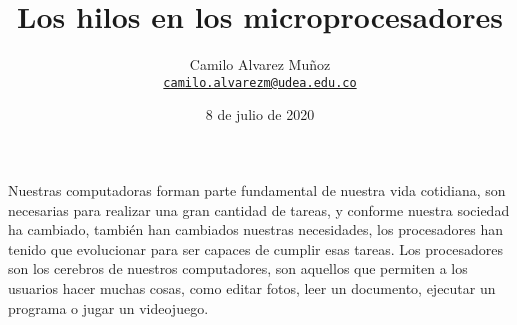 \documentclass[12pt]{article}
\title{Los hilos en los microprocesadores}
\date{8 de julio de 2020}
\author{Camilo Alvarez Muñoz\\
\href{mailto:camilo.alvarezm@udea.edu.co}{\texttt{camilo.alvarezm@udea.edu.co}}}
\begin{document}
{
\maketitle}
Nuestras computadoras forman parte fundamental de nuestra vida cotidiana, son necesarias para realizar una gran cantidad de tareas, y conforme nuestra sociedad ha cambiado, también han cambiados nuestras necesidades, los procesadores han tenido que evolucionar para ser capaces de cumplir esas tareas. Los procesadores son los cerebros de nuestros computadores, son aquellos que permiten a los usuarios hacer muchas cosas, como editar fotos, leer un documento, ejecutar un programa o jugar un videojuego. 

\medskip
 
\end{document}
